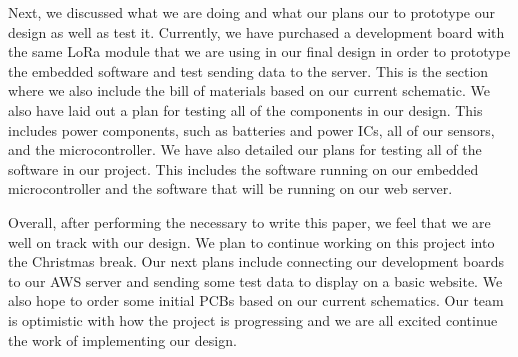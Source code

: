 Next, we discussed what we are doing and what our plans our to prototype our design as well as test it. Currently, we have purchased a development board with the same LoRa module that we are using in our final design in order to prototype the embedded software and test sending data to the server. This is the section where we also include the bill of materials based on our current schematic. We also have laid out a plan for testing all of the components in our design. This includes power components, such as batteries and power ICs, all of our sensors, and the microcontroller. We have also detailed our plans for testing all of the software in our project. This includes the software running on our embedded microcontroller and the software that will be running on our web server.

Overall, after performing the necessary to write this paper, we feel that we are well on track with our design. We plan to continue working on this project into the Christmas break. Our next plans include connecting our development boards to our AWS server and sending some test data to display on a basic website. We also hope to order some initial PCBs based on our current schematics. Our team is optimistic with how the project is progressing and we are all excited continue the work of implementing our design.